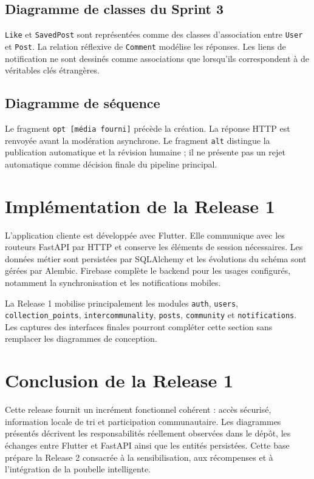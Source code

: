 \subsection{Diagramme de classes du Sprint 3}

\texttt{Like} et \texttt{SavedPost} sont représentées comme des classes d'association entre \texttt{User} et \texttt{Post}. La relation réflexive de \texttt{Comment} modélise les réponses. Les liens de notification ne sont dessinés comme associations que lorsqu'ils correspondent à de véritables clés étrangères.

\label{fig:r1_s3_class}

\subsection{Diagramme de séquence}

Le fragment \texttt{opt [média fourni]} précède la création. La réponse HTTP est renvoyée avant la modération asynchrone. Le fragment \texttt{alt} distingue la publication automatique et la révision humaine ; il ne présente pas un rejet automatique comme décision finale du pipeline principal.

\label{fig:r1_s3_seq}

\section{Implémentation de la Release 1}
\label{sec:r1_implementation}

L'application cliente est développée avec Flutter. Elle communique avec les routeurs FastAPI par HTTP et conserve les éléments de session nécessaires. Les données métier sont persistées par SQLAlchemy et les évolutions du schéma sont gérées par Alembic. Firebase complète le backend pour les usages configurés, notamment la synchronisation et les notifications mobiles.

La Release 1 mobilise principalement les modules \texttt{auth}, \texttt{users}, \texttt{collection\_points}, \texttt{intercommunality}, \texttt{posts}, \texttt{community} et \texttt{notifications}. Les captures des interfaces finales pourront compléter cette section sans remplacer les diagrammes de conception.

\section{Conclusion de la Release 1}
\label{sec:r1_conclusion}

Cette release fournit un incrément fonctionnel cohérent : accès sécurisé, information locale de tri et participation communautaire. Les diagrammes présentés décrivent les responsabilités réellement observées dans le dépôt, les échanges entre Flutter et FastAPI ainsi que les entités persistées. Cette base prépare la Release 2 consacrée à la sensibilisation, aux récompenses et à l'intégration de la poubelle intelligente.

